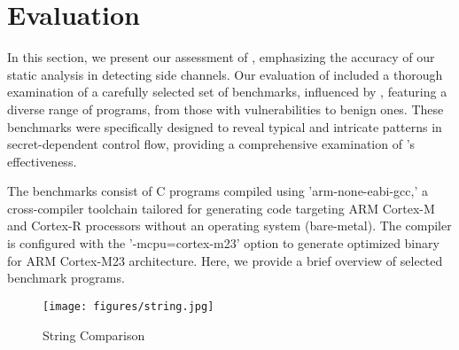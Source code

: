 \section{Evaluation}

In this section, we present our assessment of
\tool{}, emphasizing the accuracy of our static
analysis in detecting side channels. Our evaluation of
\tool{} included a thorough examination of a
carefully selected set of benchmarks, influenced by \cite{hans}, featuring
a diverse range of programs, from those with vulnerabilities to benign
ones. These benchmarks were specifically designed to reveal typical and
intricate patterns in secret-dependent control flow, providing a
comprehensive examination of \tool{}'s effectiveness. 

The benchmarks consist of C programs compiled using 'arm-none-eabi-gcc,' a
cross-compiler toolchain tailored for generating code targeting ARM
Cortex-M and Cortex-R processors without an operating system (bare-metal).
The compiler is configured with the '-mcpu=cortex-m23' option to generate
optimized binary for ARM Cortex-M23 architecture. Here, we provide a brief
overview of selected benchmark programs. 

 \begin{figure}
  \centering
  \texttt{[image: figures/string.jpg]}
  \caption{String Comparison}
  \label{fig:string}
\end{figure}


